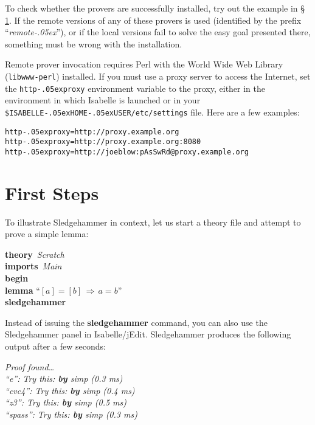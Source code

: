 \documentclass[a4paper,12pt]{article}
\let\oldS=\S
\def\S{\oldS\,}
\renewcommand\_{\hbox{\textunderscore\kern-.05ex}}
\begin{document}
To check whether the provers are successfully installed, try out the example
in \S\ref{first-steps}. If the remote versions of any of these provers is used
(identified by the prefix ``\textit{remote\_\/}''), or if the local versions
fail to solve the easy goal presented there, something must be wrong with the
installation.

Remote prover invocation requires Perl with the World Wide Web Library
(\texttt{libwww-perl}) installed. If you must use a proxy server to access the
Internet, set the \texttt{http\_proxy} environment variable to the proxy, either
in the environment in which Isabelle is launched or in your
\texttt{\$ISABELLE\_HOME\_USER/etc/settings} file. Here are a few
examples:

\prew
\texttt{http\_proxy=http://proxy.example.org} \\
\texttt{http\_proxy=http://proxy.example.org:8080} \\
\texttt{http\_proxy=http://joeblow:pAsSwRd@proxy.example.org}
\postw


\section{First Steps}
\label{first-steps}

To illustrate Sledgehammer in context, let us start a theory file and
attempt to prove a simple lemma:

\prew
\textbf{theory}~\textit{Scratch} \\
\textbf{imports}~\textit{Main} \\
\textbf{begin} \\[2\smallskipamount]
%
\textbf{lemma} ``$[a] = [b] \,\Longrightarrow\, a = b$'' \\
\textbf{sledgehammer}
\postw

Instead of issuing the \textbf{sledgehammer} command, you can also use the
Sledgehammer panel in Isabelle/jEdit. Sledgehammer produces the following output
after a few seconds:

\prew
\slshape
Proof found\ldots \\
``\textit{e\/}'': Try this: \textbf{by} \textit{simp} (0.3 ms) \\
%
``\textit{cvc4\/}'': Try this: \textbf{by} \textit{simp} (0.4 ms) \\
%
``\textit{z3\/}'': Try this: \textbf{by} \textit{simp} (0.5 ms) \\
%
``\textit{spass\/}'': Try this: \textbf{by} \textit{simp} (0.3 ms)
%
\postw
\end{document}
